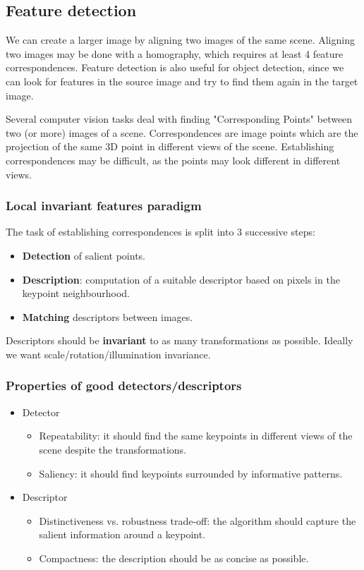 \documentclass{article}
\begin{document}
\subsection{Feature detection}
We can create a larger image by aligning two images of the same scene.
Aligning two images may be done with a homography, which requires at least 4 feature correspondences.
Feature detection is also useful for object detection, since we can look for features in the source image and try to find them again in the target image.

Several computer vision tasks deal with finding "Corresponding Points" between two (or more) images of a scene.
Correspondences are image points which are the projection of the same 3D point in different views of the scene.
Establishing correspondences may be difficult, as the points may look different in different views.

\subsubsection{Local invariant features paradigm}
The task of establishing correspondences is split into 3 successive steps:
\begin{itemize}
  \item \textbf{Detection} of salient points.
  \item \textbf{Description}: computation of a suitable descriptor based on pixels in the keypoint neighbourhood.
  \item \textbf{Matching} descriptors between images.
\end{itemize}

Descriptors should be \textbf{invariant} to as many transformations as possible.
Ideally we want scale/rotation/illumination invariance.

\subsubsection{Properties of good detectors/descriptors}
\begin{itemize}
  \item Detector
  \begin{itemize}
    \item Repeatability: it should find the same keypoints in different views of the scene despite the transformations.
    \item Saliency: it should find keypoints surrounded by informative patterns.
  \end{itemize}
  \item Descriptor
  \begin{itemize}
    \item Distinctiveness vs. robustness trade-off: the algorithm should capture the salient information around a keypoint.
    \item Compactness: the description should be as concise as possible.
  \end{itemize}
\end{itemize}
\end{document}
